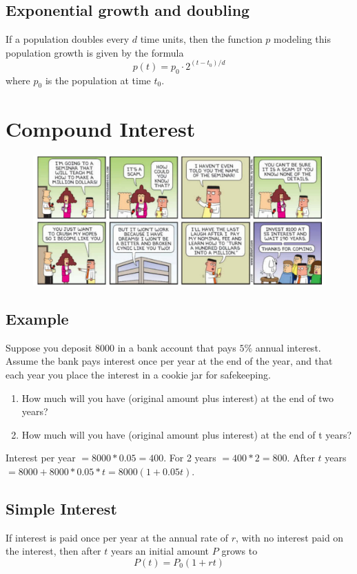 \subsection{Exponential growth and doubling}
If a population doubles every \( d \) time units, then the function \( p \) modeling this population growth is given by the formula
\[ p(t) = p_{0} \cdot 2^{(t-t_{0})/d} \]
where \(p_{0}\) is the population at time \(t_{0}\).

\section{Compound Interest}
\begin{figure}
  \includegraphics[scale=0.3]{pics/CI-comic.png}
\end{figure}

\subsection{Example}
Suppose you deposit \(8000\) in a bank account that pays \(5\%\) annual interest. Assume the bank pays interest once per year at the end of the year, and that each year you place the interest in a cookie jar for safekeeping.
\begin{enumerate}
  \item  How much will you have (original amount plus interest) at the end of two years?
  \item How much will you have (original amount plus interest) at the end of t years?
\end{enumerate}
Interest per year \( = 8000*0.05 = 400 \). For 2 years \( = 400*2 = 800\).
After \(t\) years \(= 8000 + 8000*0.05*t = 8000(1+0.05t)\).

\subsection{Simple Interest}
If interest is paid once per year at the annual rate of \(r\), with no interest paid on the interest, then after \(t\) years
an initial amount \(P\) grows to
\[ P(t) = P_{0}(1 + rt) \]

